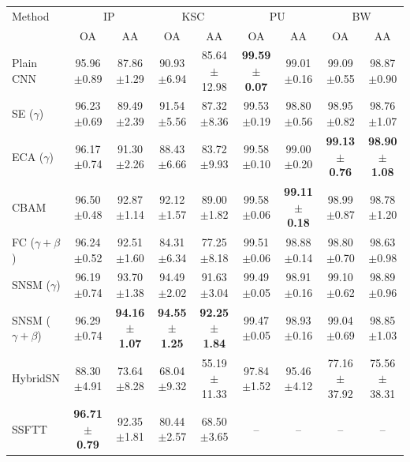 \begin{tabular}{lcccccccc}
\toprule
Method & \multicolumn{2}{c}{IP} & \multicolumn{2}{c}{KSC} & \multicolumn{2}{c}{PU} & \multicolumn{2}{c}{BW} \\
 & OA & AA & OA & AA & OA & AA & OA & AA \\
\midrule
Plain CNN & 95.96$\pm$0.89 & 87.86$\pm$1.29 & 90.93$\pm$6.94 & 85.64$\pm$12.98 & \textbf{99.59$\pm$0.07} & 99.01$\pm$0.16 & 99.09$\pm$0.55 & 98.87$\pm$0.90 \\
SE ($\gamma$) & 96.23$\pm$0.69 & 89.49$\pm$2.39 & 91.54$\pm$5.56 & 87.32$\pm$8.36 & 99.53$\pm$0.19 & 98.80$\pm$0.56 & 98.95$\pm$0.82 & 98.76$\pm$1.07 \\
ECA ($\gamma$) & 96.17$\pm$0.74 & 91.30$\pm$2.26 & 88.43$\pm$6.66 & 83.72$\pm$9.93 & 99.58$\pm$0.10 & 99.00$\pm$0.20 & \textbf{99.13$\pm$0.76} & \textbf{98.90$\pm$1.08} \\
CBAM & 96.50$\pm$0.48 & 92.87$\pm$1.14 & 92.12$\pm$1.57 & 89.00$\pm$1.82 & 99.58$\pm$0.06 & \textbf{99.11$\pm$0.18} & 98.99$\pm$0.87 & 98.78$\pm$1.20 \\
FC ($\gamma{+}\beta$) & 96.24$\pm$0.52 & 92.51$\pm$1.60 & 84.31$\pm$6.34 & 77.25$\pm$8.18 & 99.51$\pm$0.06 & 98.88$\pm$0.14 & 98.80$\pm$0.70 & 98.63$\pm$0.98 \\
SNSM ($\gamma$) & 96.19$\pm$0.74 & 93.70$\pm$1.38 & 94.49$\pm$2.02 & 91.63$\pm$3.04 & 99.49$\pm$0.05 & 98.91$\pm$0.16 & 99.10$\pm$0.62 & 98.89$\pm$0.96 \\
SNSM ($\gamma{+}\beta$) & 96.29$\pm$0.74 & \textbf{94.16$\pm$1.07} & \textbf{94.55$\pm$1.25} & \textbf{92.25$\pm$1.84} & 99.47$\pm$0.05 & 98.93$\pm$0.16 & 99.04$\pm$0.69 & 98.85$\pm$1.03 \\
\midrule
HybridSN & 88.30$\pm$4.91 & 73.64$\pm$8.28 & 68.04$\pm$9.32 & 55.19$\pm$11.33 & 97.84$\pm$1.52 & 95.46$\pm$4.12 & 77.16$\pm$37.92 & 75.56$\pm$38.31 \\
SSFTT & \textbf{96.71$\pm$0.79} & 92.35$\pm$1.81 & 80.44$\pm$2.57 & 68.50$\pm$3.65 & -- & -- & -- & -- \\
\bottomrule
\end{tabular}
